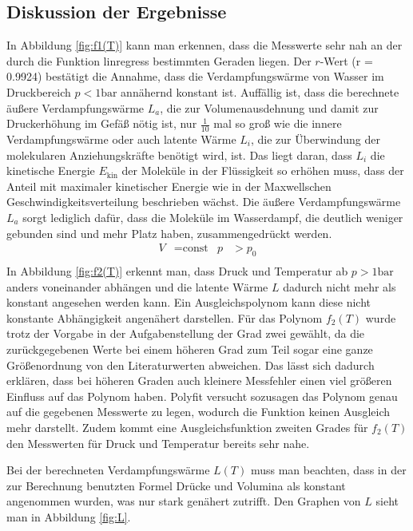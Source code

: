 \subsection{Diskussion der Ergebnisse}
In Abbildung \ref{fig:f1(T)} kann man erkennen, dass die Messwerte sehr nah
an der durch die Funktion linregress bestimmten Geraden liegen. Der $r$-Wert
(r = 0.9924) bestätigt die Annahme, dass die Verdampfungswärme von Wasser im
Druckbereich $p < 1 \si{\bar}$ annähernd konstant ist. Auffällig ist, dass
die berechnete äußere Verdampfungswärme $L_a$, die zur Volumenausdehnung und
damit zur Druckerhöhung im Gefäß nötig ist, nur $\frac{1}{10}$ mal so groß wie
die innere Verdampfungswärme oder auch latente Wärme
$L_i$, die zur Überwindung der molekularen Anziehungskräfte
benötigt wird, ist.
Das liegt daran, dass $L_i$ die kinetische Energie $E_\text{kin}$ der Moleküle in
der Flüssigkeit so erhöhen muss, dass der Anteil mit maximaler kinetischer
Energie wie in der Maxwellschen Geschwindigkeitsverteilung beschrieben wächst.
Die äußere Verdampfungswärme $L_a$ sorgt lediglich dafür, dass die Moleküle
im Wasserdampf, die deutlich weniger gebunden sind und mehr Platz haben,
zusammengedrückt werden.
\begin{align}
  V & = \text{const} & p & > p_0 \\
\end{align}
In Abbildung \ref{fig:f2(T)} erkennt man, dass Druck und Temperatur ab
$p > 1\si{\bar}$ anders voneinander abhängen und die latente Wärme $L$
dadurch nicht mehr als konstant angesehen werden kann. Ein Ausgleichspolynom
kann diese nicht konstante Abhängigkeit angenähert darstellen.
Für das Polynom $f_2(T)$ wurde trotz der Vorgabe in der Aufgabenstellung
der Grad zwei gewählt, da die zurückgegebenen Werte
bei einem höheren Grad zum Teil sogar eine ganze Größenordnung von den
Literaturwerten abweichen.
Das lässt sich dadurch erklären, dass bei höheren Graden auch kleinere
Messfehler einen viel größeren Einfluss auf das Polynom haben. Polyfit
versucht sozusagen das Polynom genau auf die gegebenen Messwerte zu legen,
wodurch die Funktion keinen Ausgleich mehr darstellt.
Zudem kommt eine Ausgleichsfunktion zweiten Grades für $f_2(T)$
den Messwerten für Druck und Temperatur bereits sehr nahe.

Bei der berechneten Verdampfungswärme $L(T)$ muss man beachten, dass in der
zur Berechnung benutzten Formel Drücke und Volumina als konstant
angenommen wurden, was nur stark genähert zutrifft. Den Graphen von $L$ sieht
man in Abbildung \ref{fig:L}.

